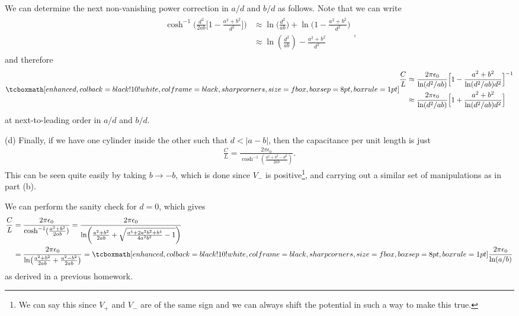{We can determine the next non-vanishing power correction in $a/d$ and $b/d$ as follows.
Note that we can write
\begin{eqnarray}
    \begin{aligned}
        \cosh^{-1}{\Big( \frac{d^2}{2ab} \Big[ 1 - \frac{a^2 + b^2}{d^2} \Big] \Big)} &\approx \ln{\Big( \frac{d^2}{ab} \Big)} + \ln{\Big( 1 - \frac{a^2 + b^2}{d^2} \Big)} \\
                                                                                      &\approx \ln(\frac{d^2}{ab}) - \frac{a^2 + b^2}{d^2}
    \end{aligned}
,\end{eqnarray}
and therefore
\begin{eqnarray}
    \eqbox{
    \begin{aligned}
        \frac{C}{L} &\approx \frac{2 \pi \epsilon_0}{\ln(d^2/ab)} \Big[ 1 - \frac{a^2 + b^2}{ \ln(d^2/ab) d^2} \Big]^{-1} \\
                    &\approx \frac{2 \pi \epsilon_0}{\ln(d^2/ab)} \Big[ 1 + \frac{a^2 + b^2}{\ln(d^2/ab) d^2} \Big]
    \end{aligned}
}
\end{eqnarray}
at next-to-leading order in $a/d$ and $b/d$.

(d) Finally, if we have one cylinder inside the other such that $d < |a - b|$, then the capacitance per unit length is just
\begin{eqnarray}
    \frac{C}{L} = \frac{2 \pi \epsilon_0}{\cosh^{-1}(\frac{a^2 + b^2 - d^2}{2 a b})}
.\end{eqnarray}
This can be seen quite easily by taking $b \rightarrow -b$, which is done since $V_{-}$ is positive\footnote{We can say this since $V_{+}$ and $V_{-}$ are of the same sign and we can always shift the potential in such a way to make this true.}, and carrying out a similar set of manipulations as in part (b).

We can perform the sanity check for $d = 0$, which gives
\begin{eqnarray}
    \begin{aligned}
        \frac{C}{L} &= \frac{2 \pi \epsilon_0}{\cosh^{-1}(\frac{a^2 + b^2}{2ab})} = \frac{2 \pi \epsilon_0}{\ln(\frac{a^2 + b^2}{2ab} + \sqrt{\frac{a^{4} + 2 a^2 b^2 + b^{4}}{4 a^2 b^2} - 1})} \\
                    &= \frac{2 \pi \epsilon_0}{\ln(\frac{a^2 + b^2}{2ab} + \frac{a^2 - b^2}{2ab})} = \eqbox{ \frac{2 \pi \epsilon_0}{\ln(a/b)} }
    \end{aligned}
\end{eqnarray}
as derived in a previous homework.

}


